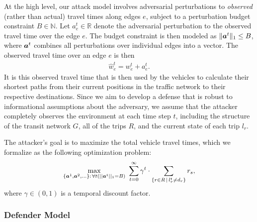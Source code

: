 At the high level, our attack model involves adversarial perturbations to \emph{observed} (rather than actual) travel times along edges $e$, subject to a perturbation budget constraint $B \in \mathbb{N}$.
Let $a_e^t \in \mathbb{R}$ denote the adversarial perturbation to the observed travel time over the edge $e$.
The budget constraint is then modeled as $\|\boldsymbol{a}^t\|_1 \le B$, where $\boldsymbol{a}^t$ combines all perturbations over individual edges into a vector.
The observed travel time over an edge $e$ is then
\begin{align}
    \hat{w}_e^t = w_e^t + a_e^t.
\end{align}
It is this observed travel time that is then used by the vehicles to calculate their shortest paths from their current positions in the traffic network to their respective destinations.
Since we aim to develop a defense that is robust to informational assumptions about the adversary, we assume that the attacker completely observes the environment at each time step $t$, including the structure of the transit network $G$, all of the trips $R$, and the current state of each trip $l_r$. %

The attacker's goal is to maximize the total vehicle travel times, which we formalize as the following optimization problem:
\begin{align}
\label{E:attack}
    \max_{\left\{\boldsymbol{a}^1, \boldsymbol{a}^2, \ldots\right\}: \, \forall t \left( || \boldsymbol{a}^t ||_1 = B \right)} ~ \sum_{t = 0}^\infty \gamma^t \cdot \sum_{\left\{ r \in R \, | \, l_r^t \neq d_r \right\}} r_s,
\end{align}
where $\gamma \in (0, 1)$ is a temporal discount factor.

\subsubsection{Defender Model}

